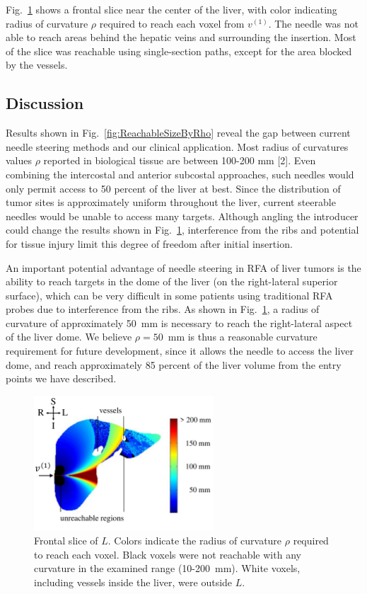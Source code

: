 Fig.~\ref{fig:FrontalSlice} shows a frontal slice near the center of the liver, with color indicating radius of curvature $\rho$ required to reach each voxel from $v^{(1)}$. The needle was not able to reach areas behind the hepatic veins and surrounding the insertion. Most of the slice was reachable using single-section paths, except for the area blocked by the vessels.

\subsection{Discussion}
Results shown in Fig.~\ref{fig:ReachableSizeByRho} reveal the gap between current needle steering methods and our clinical application. Most radius of curvatures values $\rho$ reported in biological tissue are between 100-200 mm [2]. Even combining the intercostal and anterior subcostal approaches, such needles would only permit access to 50 percent of the liver at best. Since the distribution of tumor sites is approximately uniform throughout the liver, current steerable needles would be unable to access many targets. Although angling the introducer could change the results shown in Fig.~\ref{fig:FrontalSlice}, interference from the ribs and potential for tissue injury limit this degree of freedom after initial insertion. 

An important potential advantage of needle steering in RFA of liver tumors is the ability to reach targets in the dome of the liver (on the right-lateral superior surface), which can be very difficult in some patients using traditional RFA probes due to interference from the ribs. As shown in Fig.~\ref{fig:FrontalSlice}, a radius of curvature of approximately 50~mm is necessary to reach the right-lateral aspect of the liver dome. We believe $\rho = 50$~mm is thus a reasonable curvature requirement for future development, since it allows the needle to access the liver dome, and reach approximately 85 percent of the liver volume from the entry points we have described.
  
\begin{figure}[!t]
\centering
\includegraphics[width = 0.6\textwidth]{Images/Chapter3/FrontalSlice/FrontalSlice}%
\caption[Visualization of reachable set size]{Frontal slice of $L$. Colors indicate the radius of curvature $\rho$ required to reach each voxel. Black voxels were not reachable with any curvature in the examined range (10-200~mm). White voxels, including vessels inside the liver, were outside $L$.}
\label{fig:FrontalSlice}
\end{figure}  



